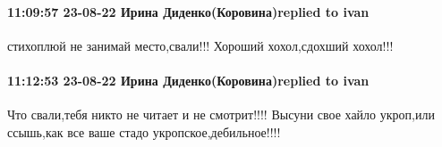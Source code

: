  
 
 
 
 

\paragraph{11:09:57 23-08-22 Ирина Диденко(Коровина)replied to ivan}

стихоплюй не занимай место,свали!!! Хороший хохол,сдохший хохол!!!


\paragraph{11:12:53 23-08-22 Ирина Диденко(Коровина)replied to ivan}

Что свали,тебя никто не читает и не смотрит!!!! Высуни свое хайло укроп,или
ссышь,как все ваше стадо укропское,дебильное!!!!
